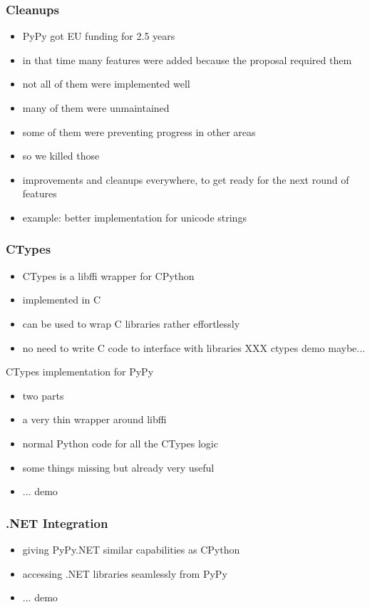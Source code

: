\documentclass[utf8x]{beamer}
\begin{document}
\begin{frame}
  \frametitle{Cleanups}
  \begin{itemize}
  \item PyPy got EU funding for 2.5 years
  \item in that time many features were added because the proposal required them
  \item not all of them were implemented well
  \item many of them were unmaintained
  \item some of them were preventing progress in other areas
  \item so we killed those
  \item improvements and cleanups everywhere, to get ready for the next round of features
  \item example: better implementation for unicode strings
  \end{itemize}
\end{frame}

\begin{frame}
  \frametitle{CTypes}
  \begin{itemize}
  \item CTypes is a libffi wrapper for CPython
  \item implemented in C
  \item can be used to wrap C libraries rather effortlessly
  \item no need to write C code to interface with libraries
        XXX ctypes demo maybe...
  
  \end{itemize}
  \pause
  \begin{block}{
    CTypes implementation for PyPy}
    \begin{itemize}
    \item two parts
    \item a very thin wrapper around libffi
    \item normal Python code for all the CTypes logic
    \item some things missing but already very useful
    \item ... demo
    \end{itemize}
  \end{block}
\end{frame}


\begin{frame}
  \frametitle{.NET Integration}
  \begin{itemize}
  \item giving PyPy.NET similar capabilities as CPython
  \item accessing .NET libraries seamlessly from PyPy
  \item ... demo
  \end{itemize}
\end{frame}
\end{document}
